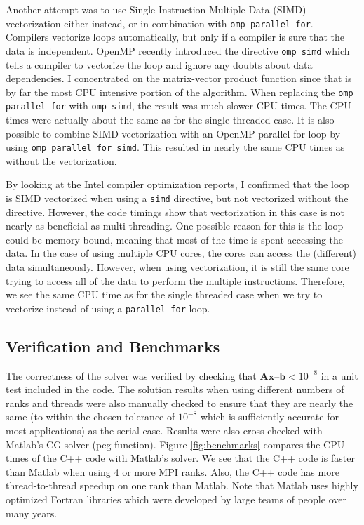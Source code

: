 \documentclass{article}
\begin{document}
Another attempt was to use Single Instruction Multiple Data (SIMD) vectorization either instead, or in combination with \texttt{omp parallel for}. Compilers vectorize loops automatically, but only if a compiler is sure that the data is independent. OpenMP recently introduced the directive \texttt{omp simd} which tells a compiler to vectorize the loop and ignore any doubts about data dependencies. I concentrated on the matrix-vector product function since that is by far the most CPU intensive portion of the algorithm. When replacing the \texttt{omp parallel for} with \texttt{omp simd}, the result was much slower CPU times. The CPU times were actually about the same as for the single-threaded case. It is also possible to combine SIMD vectorization with an OpenMP parallel for loop by using \texttt{omp parallel for simd}. This resulted in nearly the same CPU times as without the vectorization.

By looking at the Intel compiler optimization reports, I confirmed that the loop is SIMD vectorized when using a \texttt{simd} directive, but not vectorized without the directive. However, the code timings show that vectorization in this case is not nearly as beneficial as multi-threading. One possible reason for this is the loop could be memory bound, meaning that most of the time is spent accessing the data. In the case of using multiple CPU cores, the cores can access the (different) data simultaneously. However, when using vectorization, it is still the same core trying to access all of the data to perform the multiple instructions. Therefore, we see the same CPU time as for the single threaded case when we try to vectorize instead of using a \texttt{parallel for} loop.

\subsection{Verification and Benchmarks}
The correctness of the solver was verified by checking that $\mathbf{Ax} – \mathbf{b} < 10^{-8}$ in a unit test included in the code. The solution results when using different numbers of ranks and threads were also manually checked to ensure that they are nearly the same (to within the chosen tolerance of $10^{-8}$ which is sufficiently accurate for most applications) as the serial case. Results were also cross-checked with Matlab’s CG solver (pcg function). Figure \ref{fig:benchmarks} compares the CPU times of the C++ code with Matlab’s solver. We see that the C++ code is faster than Matlab when using 4 or more MPI ranks. Also, the C++ code has more thread-to-thread speedup on one rank than Matlab. Note that Matlab uses highly optimized Fortran libraries which were developed by large teams of people over many years.
\end{document}
